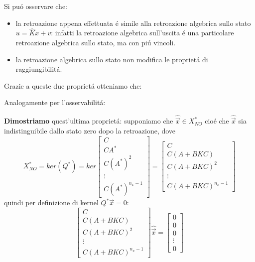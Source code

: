 \documentclass[../main.tex]{subfiles}
\begin{document}
		Si pu\'o osservare che:
		\begin{itemize}
			\item 
				la retroazione appena effettuata \'e simile alla retroazione algebrica sullo stato $ u = \hat K x+ v $: infatti la retroazione algebrica sull'uscita \'e una particolare retroazione algebrica sullo stato, ma con pi\'u vincoli.
			\item 
				la retroazione algebrica sullo stato non modifica le propriet\'a di raggiungibilit\'a.
		\end{itemize}
		Grazie a queste due propriet\'a otteniamo che:
		\begin{center}
		\end{center}
		Analogamente per l'osservabilit\'a:
		\begin{center}
		\end{center}
		\textbf{Dimostriamo} quest'ultima propriet\'a:
		supponiamo che $ \hat{\vec x} \in X_{NO}^{*} $ cio\'e che $ \hat{\vec x} $ sia indistinguibile dallo stato zero dopo la retroazione, dove
		\[
			X_{NO}^{*} = ker(Q^{*}) = ker
			\begin{bmatrix}
				C\\
				CA^{*}\\
				C(A^{*})^2\\
				\vdots\\
				C(A^{*})^{n_x-1}
			\end{bmatrix} =
			\begin{bmatrix}
				C\\
				C(A+BKC)\\
				C(A+BKC)^2\\
				\vdots\\
				C(A+BKC)^{n_x-1}
			\end{bmatrix}
		\]
		quindi per definizione di kernel $ Q^{*} \vec x = 0 $:
		\[
			\begin{bmatrix}
				C\\
				C(A+BKC)\\
				C(A+BKC)^2\\
				\vdots\\
				C(A+BKC)^{n_x-1}
			\end{bmatrix} \hat{\vec x} =
			\begin{bmatrix}
				0\\
				0\\
				0\\
				\vdots\\
				0
			\end{bmatrix}
		\]
\end{document}
